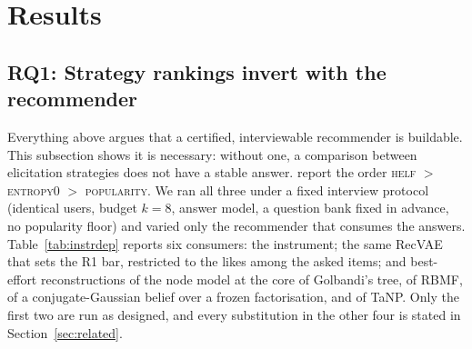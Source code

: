\documentclass[manuscript,screen]{acmart}
\begin{document}
\section{Results}\label{sec:results}

\subsection{RQ1: Strategy rankings invert with the recommender}\label{sec:res:inversion}

Everything above argues that a certified, interviewable recommender is buildable. This subsection shows it is necessary: without one, a comparison between elicitation strategies does not have a stable answer. \citet{rashid2008learning} report the order \textsc{helf} $>$ \textsc{entropy0} $>$ \textsc{popularity}. We ran all three under a fixed interview protocol (identical users, budget $k{=}8$, answer model, a question bank fixed in advance, no popularity floor) and varied only the recommender that consumes the answers. Table~\ref{tab:instrdep} reports six consumers: the instrument; the same RecVAE that sets the R1 bar, restricted to the likes among the asked items; and best-effort reconstructions of the node model at the core of Golbandi's tree, of RBMF, of a conjugate-Gaussian belief over a frozen factorisation, and of TaNP. Only the first two are run as designed, and every substitution in the other four is stated in Section~\ref{sec:related}.
\end{document}
